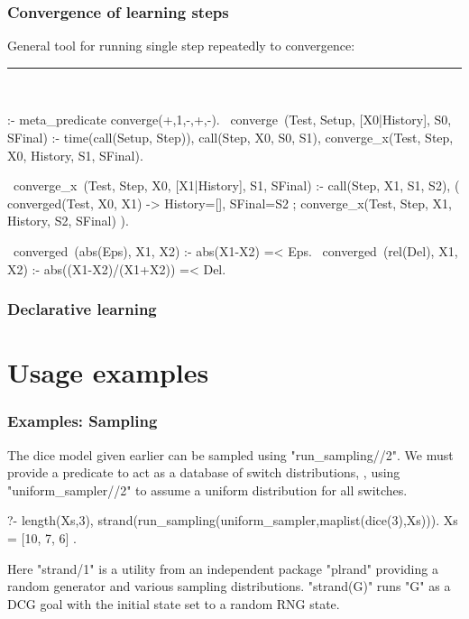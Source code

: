 \documentclass[usenames,dvipsnames]{beamer}
\newenvironment{iframe}[1][untitled]{\begin{frame}\frametitle{#1}}{\end{frame}}
\newenvironment{isframe}[1][untitled]{\begin{frame}[fragile=singleslide,environment=isframe]\frametitle{#1}}{\end{frame}}
\begin{document}
\begin{isframe}[Convergence of learning steps]
General tool for running single step repeatedly to convergence:
\rule{\linewidth}{0.4pt}\\
\begin{prolog}[xleftmargin=0em,basicstyle=\small]
	:- meta_predicate converge(+,1,-,+,-).
	~converge~(Test, Setup, [X0|History], S0, SFinal) :-
		 time(call(Setup, Step)),
		 call(Step, X0, S0, S1),
		 converge_x(Test, Step, X0, History, S1, SFinal).

	~converge_x~(Test, Step, X0, [X1|History], S1, SFinal) :-
		 call(Step, X1, S1, S2),
		 (  converged(Test, X0, X1) -> History=[], SFinal=S2
		 ;  converge_x(Test, Step, X1, History, S2, SFinal)
		 ).

	~converged~(abs(Eps), X1, X2) :- abs(X1-X2) =< Eps.
	~converged~(rel(Del), X1, X2) :- abs((X1-X2)/(X1+X2)) =< Del.
\end{prolog}
\end{isframe}

\begin{iframe}[Declarative learning]



\end{iframe}

\section{Usage examples}


\begin{isframe}[Examples: Sampling]
  The dice model given earlier can be sampled using "run_sampling//2". We must
provide a predicate to act as a database of switch distributions, \eg, using "uniform_sampler//2"
to assume a uniform distribution for all switches.
\begin{prolog-barred}
  ?- length(Xs,3), 
     strand(run_sampling(uniform_sampler,maplist(dice(3),Xs))).
  Xs = [10, 7, 6] .
\end{prolog-barred}
Here "strand/1" is a utility from an independent package
"plrand" providing a random generator
and various sampling distributions. "strand(G)" runs "G" as a DCG goal with the initial 
state set to a random RNG state.
\end{isframe}
\end{document}
